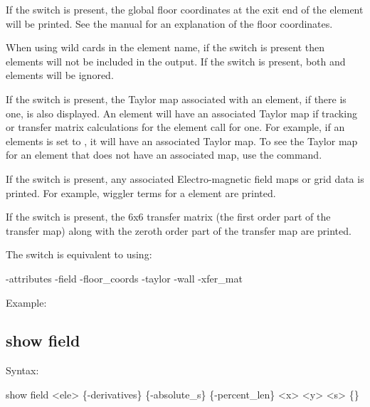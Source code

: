 {{{{{{{{If the  switch is present, the global floor coordinates at the exit end of the
element will be printed. See the \bmad manual for an explanation of the floor coordinates.

When using wild cards in the element name, if the  switch is present then
 elements will not be included in the output. If the  switch is
present, both  and  elements will be ignored.

If the  switch is present, the Taylor map associated with an element, if there is one,
is also displayed. An element will have an associated Taylor map if tracking or transfer matrix
calculations for the element call for one. For example, if an elements  is set
to , it will have an associated Taylor map. To see the Taylor map for an element that
does not have an associated map, use the  command.

If the  switch is present, any associated Electro-magnetic field maps or grid data is
printed. For example, wiggler terms for a   element are printed.

If the  switch is present, the 6x6 transfer matrix (the first order part of the
transfer map) along with the zeroth order part of the transfer map are printed.

The  switch is equivalent to using:
\begin{example}
  -attributes
  -field
  -floor_coords
  -taylor
  -wall
  -xfer_mat
\end{example}

Example:


\subsection{show field}
\label{s:show.field}

Syntax:
\begin{example}
  show field <ele> \{-derivatives\} \{-absolute_s\} \{-percent_len\} <x> <y> <s> \{<t-or-z>\}
\end{example}

}}}}}}}}
